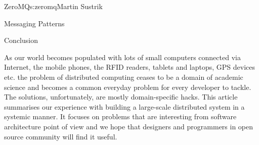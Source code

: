 \begin{aosachapter}{ZeroMQ}{s:zeromq}{Martin Sustrik}
\begin{aosasect1}{Messaging Patterns}
\end{aosasect1}

\begin{aosasect1}{Conclusion}

As our world becomes populated with lots of small computers connected
via Internet, the mobile phones, the RFID readers, tablets and
laptops, GPS devices etc. the problem of distributed computing ceases
to be a domain of academic science and becomes a common everyday
problem for every developer to tackle. The solutions, unfortunately,
are mostly domain-specific hacks. This article summarises our
experience with building a large-scale distributed system in a
systemic manner. It focuses on problems that are interesting from
software architecture point of view and we hope that designers and
programmers in open source community will find it useful.

\end{aosasect1}

\end{aosachapter}
